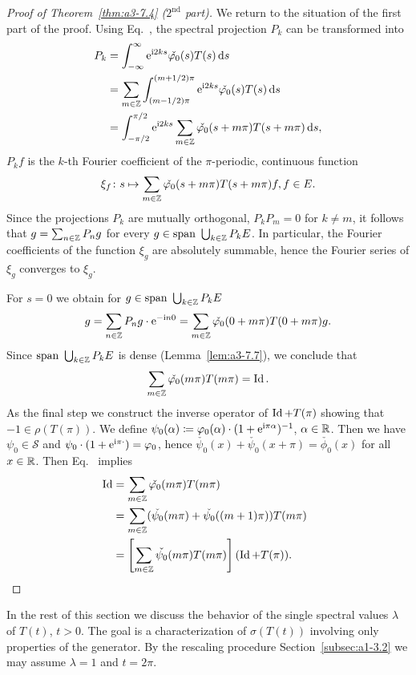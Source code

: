 \begin{proof}[Proof of Theorem~\ref{thm:a3-7.4} ($ 2^{\text{nd}} $ part)]
We return to the situation of the first part of the proof.
Using Eq.~, the spectral projection $P_{k}$ can be transformed into
\begin{align*}
P_{k} &= \int_{-\infty}^{\infty} \eu^{\im 2ks}\check{\phi_{0}}(s)T(s)\ds \\
&= \sum_{m\in\Z} \int_{(m-1/2)\pi}^{(m+1/2)\pi} \eu^{\im 2ks}\check{\phi_{0}}(s)T(s)\ds \\
&= \int_{-\pi/2}^{\pi/2} \eu^{\im 2ks}\sum_{m\in\Z}\check{\phi_{0}}(s+m\pi)T(s+m\pi)\ds ,
\end{align*}
\ie $P_{k}f$ is the $k$-th Fourier coefficient of the $\pi$-periodic, continuous function 
\[
\xi_{f} \colon s \mapsto \sum_{m\in\Z} \check{\phi_{0}}(s+m\pi)T(s+m\pi)f ,  f \in E .
\]
Since the projections $P_{k}$ are mutually orthogonal, \ie $P_{k}P_{m} = 0$ for $k \neq m$, it follows that $g = \sum_{n\in\mathbb{Z}} P_{n}g$ for every $g \in \text{span }\bigcup_{k\in\mathbb{Z}} P_{k}E$.
In particular, the Fourier coefficients of the function $\xi_{g}$ are absolutely summable, hence the Fourier series of\/ $\xi_{g}$ converges to $\xi_g$.

For $s = 0$ we obtain for 
$g \in \text{span }\bigcup_{k\in\mathbb{Z}} P_{k}E$
\[
g = \sum_{n\in\Z} P_{n}g\cdot \eu^{-\im n0} = \sum_{m\in\Z} \check{\phi_{0}}(0 + m\pi)T(0 + m\pi)g .
\]
Since $\text{span }\bigcup_{k\in\mathbb{Z}} P_{k}E$ is dense (Lemma~\ref{lem:a3-7.7}), we conclude that
\begin{equation}\label{eq:a3-7.6}
\sum_{m\in\Z} \check{\phi_{0}}(m\pi)T(m\pi) = \Id .
\end{equation}
As the final step we construct the inverse operator of\/ $\operatorname{Id} + T(\pi)$ showing that $-1 \in \rho(T(\pi))$.
We define $\psi_{0}(\alpha) \coloneq \phi_{0}(\alpha)\cdot(1 + \eu^{\im\pi\alpha})^{-1}$, $\alpha \in \mathbb{R}$.
Then we have $\psi_{0} \in \mathcal{S}$ and $\psi_{0}\cdot(1 + \eu^{\im\pi\cdot}) = \phi_{0}$,
hence $\check{\psi_{0}}(x) + \check{\psi_{0}}(x + \pi) = \check{\phi_{0}}(x)$ for all $x \in \mathbb{R}$.
Then Eq.~ implies
\begin{align*}
\Id &= \sum_{m\in\Z} \check{\phi_{0}}(m\pi)T(m\pi) \\
&= \sum_{m\in\Z} (\check{\psi_{0}}(m\pi) + \check{\psi_{0}}((m+1)\pi))T(m\pi) \\
&= \left[ \sum_{m\in\Z} \check{\psi_{0}}(m\pi)T(m\pi) \right] (\Id + T(\pi)) . \tag*{\qedsymbol}%
\end{align*}
\let\qedsymbol\relax
\end{proof}
In the rest of this section we discuss the behavior of the single spectral values $\lambda$ of\/ $T(t)$, $t > 0$.
The goal is a characterization of\/ $\sigma(T(t))$ involving only properties of the generator.
By the rescaling procedure Section~\ref{subsec:a1-3.2} we may assume $\lambda = 1$ and $t = 2\pi$.

